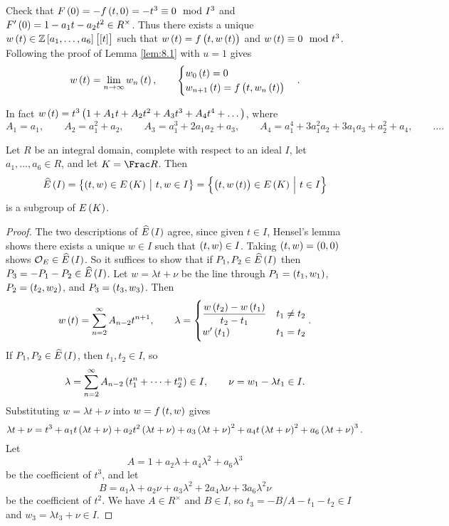 \pagebreak

Check that $ F\br{0} = -f\br{t, 0} = -t^3 \equiv 0 \mod I^3 $ and $ F'\br{0} = 1 - a_1t - a_2t^2 \in R^\times $. Thus there exists a unique $ w\br{t} \in \ZZ\sbr{a_1, \dots, a_6}\sbr{\sbr{t}} $ such that $ w\br{t} = f\br{t, w\br{t}} $ and $ w\br{t} \equiv 0 \mod t^3 $. Following the proof of Lemma \ref{lem:8.1} with $ u = 1 $ gives
$$ w\br{t} = \lim_{n \to \infty} w_n\br{t}, \qquad
\begin{cases}
w_0\br{t} = 0 \\
w_{n + 1}\br{t} = f\br{t, w_n\br{t}}
\end{cases}.
$$


In fact $ w\br{t} = t^3\br{1 + A_1t + A_2t^2 + A_3t^3 + A_4t^4 + \dots} $, where
$$ A_1 = a_1, \qquad A_2 = a_1^2 + a_2, \qquad A_3 = a_1^3 + 2a_1a_2 + a_3, \qquad A_4 = a_1^4 + 3a_1^2a_2 + 3a_1a_3 + a_2^2 + a_4, \qquad \dots. $$

\begin{lemma}
\label{lem:8.2}
Let $ R $ be an integral domain, complete with respect to an ideal $ I $, let $ a_1, \dots, a_6 \in R $, and let $ K = \Frac R $. Then
$$ \widehat{E}\br{I} = \cbr{\br{t, w} \in E\br{K} \st t, w \in I} = \cbr{\br{t, w\br{t}} \in E\br{K} \st t \in I} $$
is a subgroup of $ E\br{K} $.
\end{lemma}

\begin{proof}
The two descriptions of $ \widehat{E}\br{I} $ agree, since given $ t \in I $, Hensel's lemma shows there exists a unique $ w \in I $ such that $ \br{t, w} \in I $. Taking $ \br{t, w} = \br{0, 0} $ shows $ \OOO_E \in \widehat{E}\br{I} $. So it suffices to show that if $ P_1, P_2 \in \widehat{E}\br{I} $ then $ P_3 = -P_1 - P_2 \in \widehat{E}\br{I} $. Let $ w = \lambda t + \nu $ be the line through $ P_1 = \br{t_1, w_1} $, $ P_2 = \br{t_2, w_2} $, and $ P_3 = \br{t_3, w_3} $. Then
$$ w\br{t} = \sum_{n = 2}^\infty A_{n - 2}t^{n + 1}, \qquad \lambda =
\begin{cases}
\dfrac{w\br{t_2} - w\br{t_1}}{t_2 - t_1} & t_1 \ne t_2 \\
w'\br{t_1} & t_1 = t_2
\end{cases}.
$$
If $ P_1, P_2 \in \widehat{E}\br{I} $, then $ t_1, t_2 \in I $, so
$$ \lambda = \sum_{n = 2}^\infty A_{n - 2}\br{t_1^n + \dots + t_2^n} \in I, \qquad \nu = w_1 - \lambda t_1 \in I. $$
Substituting $ w = \lambda t + \nu $ into $ w = f\br{t, w} $ gives
$$ \lambda t + \nu = t^3 + a_1t\br{\lambda t + \nu} + a_2t^2\br{\lambda t + \nu} + a_3\br{\lambda t + \nu}^2 + a_4t\br{\lambda t + \nu}^2 + a_6\br{\lambda t + \nu}^3. $$
Let
$$ A = 1 + a_2\lambda + a_4\lambda^2 + a_6\lambda^3 $$
be the coefficient of $ t^3 $, and let
$$ B = a_1\lambda + a_2\nu + a_3\lambda^2 + 2a_4\lambda\nu + 3a_6\lambda^2\nu $$
be the coefficient of $ t^2 $. We have $ A \in R^\times $ and $ B \in I $, so $ t_3 = -B / A - t_1 - t_2 \in I $ and $ w_3 = \lambda t_3 + \nu \in I $.
\end{proof}

